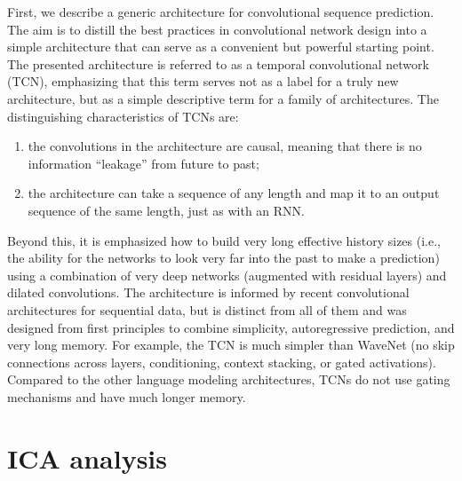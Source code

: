 \documentclass[12pt,a4paper,titlepage,openany]{report}
\begin{document}
First, we describe a generic architecture for convolutional sequence prediction. 
The aim is to distill the best practices in convolutional network design into a simple architecture that can serve as a convenient but powerful starting point. 
The presented architecture is referred to as a temporal convolutional network (TCN), emphasizing that this term serves not as a label for a truly new architecture, but as a simple descriptive term for a family of architectures. 
The distinguishing characteristics of TCNs are: 
\begin{enumerate}
     \item the convolutions in the architecture are causal, meaning that there is no information “leakage” from future to past; 
     \item the architecture can take a sequence of any length and map it to an output sequence of the same length, just as with an RNN. 
\end{enumerate}   
Beyond this, it is emphasized how to build very long effective history sizes (i.e., the ability for the networks to look very far into the past to make a prediction) using a combination of very deep networks (augmented with residual layers) and dilated convolutions. The architecture is informed by recent convolutional architectures for sequential data, but is distinct from all of them and was designed from first principles to combine simplicity, autoregressive prediction, and very long memory. For example, the TCN is much simpler than WaveNet (no skip connections across layers, conditioning, context stacking, or gated activations). 
Compared to the other language modeling architectures, TCNs do not use gating mechanisms and have much longer memory\cite{bai2018}.

\section{ICA analysis}
\end{document}
